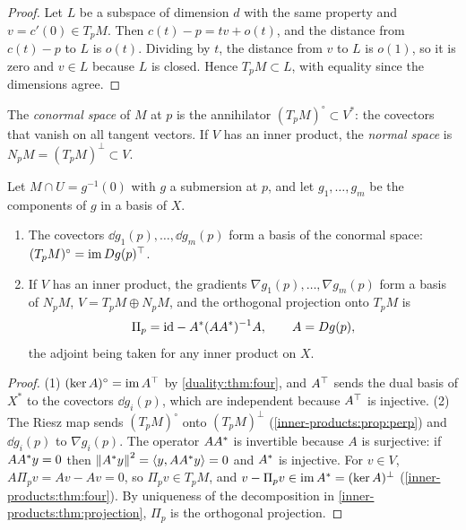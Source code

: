 \begin{notechapter}
\begin{proof}
Let $L$ be a subspace of dimension $d$ with the same property and
$v = c'(0)\in T_pM$. Then $c(t) - p = tv + o(t)$, and the distance from
$c(t) - p$ to $L$ is $o(t)$. Dividing by $t$, the distance from $v$ to $L$
is $o(1)$, so it is zero and $v\in L$ because $L$ is closed. Hence
$T_pM\subset L$, with equality since the dimensions agree.
\end{proof}

\begin{definition}
\label{submanifolds:def:normal}
The \emph{conormal space} of $M$ at $p$ is the annihilator
$(T_pM)^\circ\subset V^*$: the covectors that vanish on all tangent
vectors. If $V$ has an inner product, the \emph{normal space} is
$N_pM = (T_pM)^\perp\subset V$.
\end{definition}

\begin{proposition}\label{submanifolds:prop:normal}
Let $M\cap U = g^{-1}(0)$ with $g$ a submersion at $p$, and let
$g_1,\dots,g_m$ be the components of $g$ in a basis of $X$.
\begin{enumerate}[nosep]
  \item The covectors $\dd g_1(p),\dots,\dd g_m(p)$ form a basis of the
        conormal space: $(T_pM)^\circ = \operatorname{im}Dg(p)^{\top}$.
  \item If $V$ has an inner product, the gradients
        $\nabla g_1(p),\dots,\nabla g_m(p)$ form a basis of $N_pM$,
        $V = T_pM\oplus N_pM$, and the orthogonal projection onto $T_pM$
        is
        \[
          \Pi_p = \mathrm{id} - A^{*}(AA^{*})^{-1}A , \qquad A = Dg(p) ,
        \]
        the adjoint being taken for any inner product on $X$.
\end{enumerate}
\end{proposition}

\begin{proof}
(1) $(\ker A)^\circ = \operatorname{im}A^{\top}$ by \cref{duality:thm:four}, and
$A^{\top}$ sends the dual basis of $X^*$ to the covectors $\dd g_i(p)$,
which are independent because $A^{\top}$ is injective. (2) The Riesz map
sends $(T_pM)^\circ$ onto $(T_pM)^\perp$ (\cref{inner-products:prop:perp})
and $\dd g_i(p)$ to $\nabla g_i(p)$. The operator $AA^{*}$ is invertible
because $A$ is surjective: if $AA^{*}y = 0$ then
$\left\|A^{*}y\right\|^2 = \left\langle y, AA^{*}y \right\rangle = 0$ and $A^{*}$ is injective. For
$v\in V$, $A\Pi_pv = Av - Av = 0$, so $\Pi_pv\in T_pM$, and
$v - \Pi_pv\in\operatorname{im}A^{*} = (\ker A)^\perp$
(\cref{inner-products:thm:four}). By uniqueness of the decomposition in
\cref{inner-products:thm:projection}, $\Pi_p$ is the orthogonal
projection.
\end{proof}


\end{notechapter}
